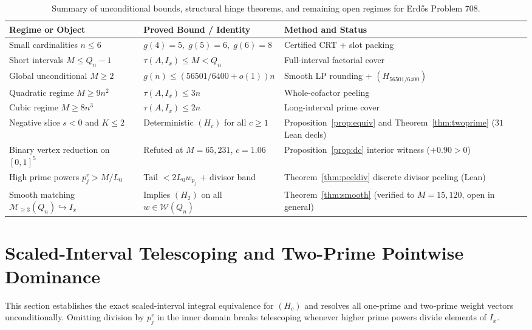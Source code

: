 \documentclass[11pt]{article}
\begin{document}
\begin{table}[ht]
\centering
\small
\begin{tabular}{p{4.5cm}p{4.8cm}p{5.8cm}}
\toprule
Regime or Object & Proved Bound / Identity & Method and Status \\
\midrule
Small cardinalities $n \le 6$ & $g(4) = 5,\; g(5) = 6,\; g(6) = 8$ & Certified CRT + slot packing~\cite{bergstrom26small} \\
Short intervals $M \le Q_n - 1$ & $\tau(A, I_x) \le M < Q_n$ & Full-interval factorial cover~\cite{bergstrom26asymptotic} \\
Global unconditional $M \ge 2$ & $g(n) \le (56501 / 6400 + o(1)) n$ & Smooth LP rounding + $(H_{56501/6400})$~\cite{bergstrom26asymptotic} \\
Quadratic regime $M \ge 9n^2$ & $\tau(A, I_x) \le 3n$ & Whole-cofactor peeling~\cite{bergstrom26asymptotic} \\
Cubic regime $M \ge 8n^3$ & $\tau(A, I_x) \le 2n$ & Long-interval prime cover~\cite{chen26} \\
Negative slice $s < 0$ and $K \le 2$ & Deterministic $(H_c)$ for all $c \ge 1$ & Proposition~\ref{prop:equiv} and Theorem~\ref{thm:twoprime} ($31$ Lean decls) \\
Binary vertex reduction on $[0, 1]^5$ & Refuted at $M = 65{,}231$, $c = 1.06$ & Proposition~\ref{prop:dc} interior witness ($+0.90 > 0$) \\
High prime powers $p_j^r > M / L_0$ & Tail $< 2 L_0 w_{p_j}$ + divisor band & Theorem~\ref{thm:peeldiv} discrete divisor peeling (Lean) \\
Smooth matching $\mathcal{M}_{\ge 3}(Q_n) \hookrightarrow I_x$ & Implies $(H_2)$ on all $w \in \mathcal{W}(Q_n)$ & Theorem~\ref{thm:smooth} (verified to $M = 15{,}120$, open in general) \\
\bottomrule
\end{tabular}
\caption{Summary of unconditional bounds, structural hinge theorems, and remaining open regimes for Erd\H{o}s Problem 708.}
\label{tab:overview}
\end{table}

\section{Scaled-Interval Telescoping and Two-Prime Pointwise Dominance}

This section establishes the exact scaled-interval integral equivalence for $(H_c)$ and resolves all one-prime and two-prime weight vectors unconditionally. Omitting division by $p_j^r$ in the inner domain breaks telescoping whenever higher prime powers divide elements of $I_x$.
\end{document}
